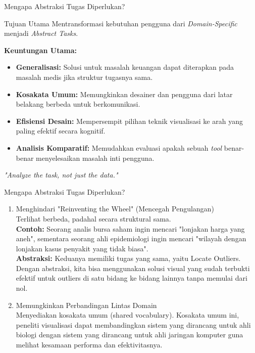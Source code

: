 \documentclass[t]{beamer}
\begin{document}
\begin{frame}{Mengapa Abstraksi Tugas Diperlukan?}
    \begin{block}{Tujuan Utama}
        Mentransformasi kebutuhan pengguna dari \textit{Domain-Specific} menjadi \textit{Abstract Tasks}.
    \end{block}

    \vspace{0.3cm}
    \textbf{Keuntungan Utama:}
    \begin{itemize}
        \item \textbf{Generalisasi:} Solusi untuk masalah keuangan dapat diterapkan pada masalah medis jika struktur tugasnya sama.
        \item \textbf{Kosakata Umum:} Memungkinkan desainer dan pengguna dari latar belakang berbeda untuk berkomunikasi.
        \item \textbf{Efisiensi Desain:} Mempersempit pilihan teknik visualisasi ke arah yang paling efektif secara kognitif.
        \item \textbf{Analisis Komparatif:} Memudahkan evaluasi apakah sebuah \textit{tool} benar-benar menyelesaikan masalah inti pengguna.
    \end{itemize}

    \vspace{0.3cm}
    \centering \textit{"Analyze the task, not just the data."}
\end{frame}

\begin{frame}{Mengapa Abstraksi Tugas Diperlukan?}
	\begin{enumerate}
		\item Menghindari "Reinventing the Wheel" (Mencegah Pengulangan) \\
		Terlihat berbeda, padahal secara struktural sama. \\ \textbf{Contoh:} Seorang analis bursa saham ingin mencari "lonjakan harga yang aneh", sementara seorang ahli epidemiologi ingin mencari "wilayah dengan lonjakan kasus penyakit yang tidak biasa". \\ \textbf{Abstraksi:} Keduanya memiliki tugas yang sama, yaitu Locate Outliers. Dengan abstraksi, kita bisa menggunakan solusi visual yang sudah terbukti efektif untuk outliers di satu bidang ke bidang lainnya tanpa memulai dari nol.
		\item Memungkinkan Perbandingan Lintas Domain \\
		Menyediakan kosakata umum (shared vocabulary). Kosakata umum ini, peneliti visualisasi dapat membandingkan sistem yang dirancang untuk ahli biologi dengan sistem yang dirancang untuk ahli jaringan komputer guna melihat kesamaan performa dan efektivitasnya.
	\end{enumerate}
\end{frame}
\end{document}
